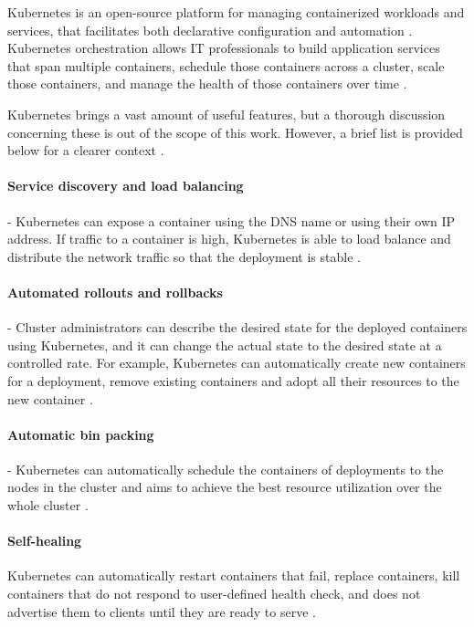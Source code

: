 Kubernetes is an open-source platform for managing containerized workloads and services, that facilitates both declarative configuration and automation \cite{KubernetesOverview}. Kubernetes orchestration allows IT professionals to build application services that span multiple containers, schedule those containers across a cluster, scale those containers, and manage the health of those containers over time \cite{KubernetesOverviewRH}.

Kubernetes brings a vast amount of useful features, but a thorough discussion concerning these is out of the scope of this work. However, a brief list is provided below for a clearer context \cite{KubernetesOverview}.

\paragraph{Service discovery and load balancing} - Kubernetes can expose a container using the DNS name or using their own IP address. If traffic to a container is high, Kubernetes is able to load balance and distribute the network traffic so that the deployment is stable \cite{KubernetesOverview}.

\paragraph{Automated rollouts and rollbacks} - Cluster administrators can describe the desired state for the deployed containers using Kubernetes, and it can change the actual state to the desired state at a controlled rate. For example, Kubernetes can automatically create new containers for a deployment, remove existing containers and adopt all their resources to the new container \cite{KubernetesOverview}.

\paragraph{Automatic bin packing} - Kubernetes can automatically schedule the containers of deployments to the nodes in the cluster and aims to achieve the best resource utilization over the whole cluster \cite{KubernetesOverview}.

\paragraph{Self-healing} Kubernetes can automatically restart containers that fail, replace containers, kill containers that do not respond to user-defined health check, and does not advertise them to clients until they are ready to serve \cite{KubernetesOverview}.

